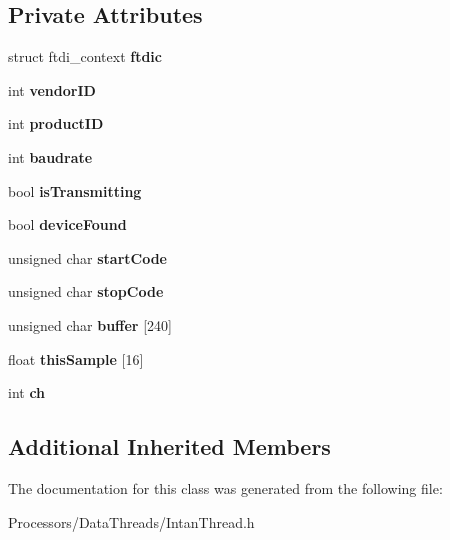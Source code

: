 \subsection*{Private Attributes}
\begin{DoxyCompactItemize}
\item 
\hypertarget{classIntanThread_a37dbef0918583861834fede108f3d753}{struct ftdi\-\_\-context {\bfseries ftdic}}\label{classIntanThread_a37dbef0918583861834fede108f3d753}

\item 
\hypertarget{classIntanThread_abbd43910e0876c010eed8c98ecfdc8cd}{int {\bfseries vendor\-I\-D}}\label{classIntanThread_abbd43910e0876c010eed8c98ecfdc8cd}

\item 
\hypertarget{classIntanThread_a45370212da99d373c584f3449d234782}{int {\bfseries product\-I\-D}}\label{classIntanThread_a45370212da99d373c584f3449d234782}

\item 
\hypertarget{classIntanThread_a65a860c5a971cd06d04d1a8c2ab79d3f}{int {\bfseries baudrate}}\label{classIntanThread_a65a860c5a971cd06d04d1a8c2ab79d3f}

\item 
\hypertarget{classIntanThread_a84c105d2757d8754c47d5dd93df74b5b}{bool {\bfseries is\-Transmitting}}\label{classIntanThread_a84c105d2757d8754c47d5dd93df74b5b}

\item 
\hypertarget{classIntanThread_a511e2ff1aa94f4cb9587bbcdcd55f2b3}{bool {\bfseries device\-Found}}\label{classIntanThread_a511e2ff1aa94f4cb9587bbcdcd55f2b3}

\item 
\hypertarget{classIntanThread_ad6fdd19d2044eb3161924a160663f19f}{unsigned char {\bfseries start\-Code}}\label{classIntanThread_ad6fdd19d2044eb3161924a160663f19f}

\item 
\hypertarget{classIntanThread_a33ff5cf792130bbc0e8aafbb5c251073}{unsigned char {\bfseries stop\-Code}}\label{classIntanThread_a33ff5cf792130bbc0e8aafbb5c251073}

\item 
\hypertarget{classIntanThread_ac76338b0917a125e3cf89fe92dade29b}{unsigned char {\bfseries buffer} \mbox{[}240\mbox{]}}\label{classIntanThread_ac76338b0917a125e3cf89fe92dade29b}

\item 
\hypertarget{classIntanThread_a6e8567c4b60bd8490faf9b8a78c5f4c2}{float {\bfseries this\-Sample} \mbox{[}16\mbox{]}}\label{classIntanThread_a6e8567c4b60bd8490faf9b8a78c5f4c2}

\item 
\hypertarget{classIntanThread_af1ce1bc20b17eadd1906d74066d42f0d}{int {\bfseries ch}}\label{classIntanThread_af1ce1bc20b17eadd1906d74066d42f0d}

\end{DoxyCompactItemize}
\subsection*{Additional Inherited Members}


The documentation for this class was generated from the following file\-:\begin{DoxyCompactItemize}
\item 
Processors/\-Data\-Threads/Intan\-Thread.\-h\end{DoxyCompactItemize}
